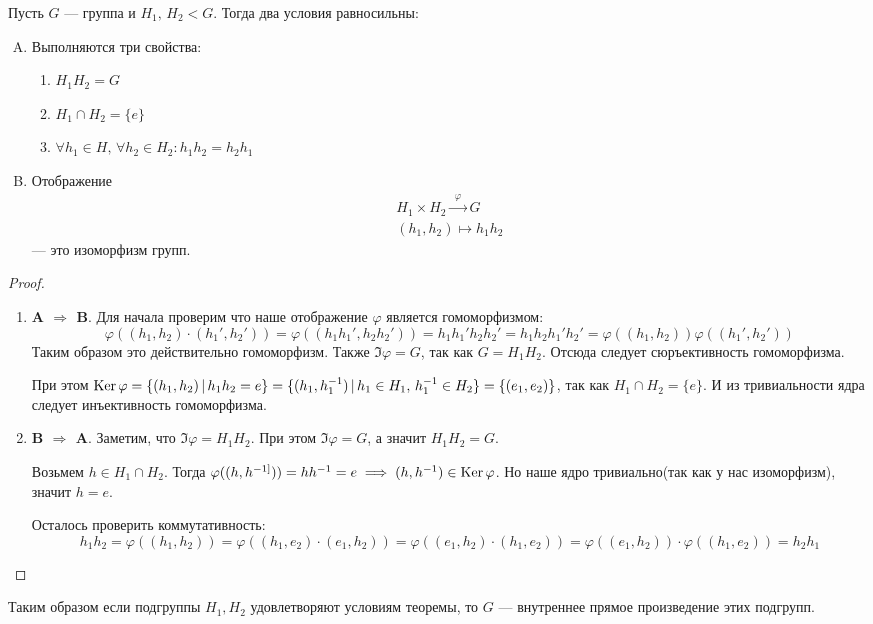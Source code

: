 \documentclass[../main.tex]{subfiles}
\begin{document}
\begin{theorem}
  Пусть $G$ --- группа и $H_1,\, H_2 < G$. Тогда два условия равносильны:
  \begin{enumerate}[A.]
    \item Выполняются три свойства:
    \begin{enumerate}[1)]
      \item $H_1H_2 = G$
      \item $H_1 \cap H_2 = \{e\}$
      \item $\forall h_1 \in H,\, \forall h_2 \in H_2\colon h_1h_2 = h_2h_1$
    \end{enumerate}
    \item Отображение
    \begin{equation*}
      \begin{gathered}
        H_1 \times H_2 \xrightarrow{\;\, \varphi \;\,} G \\
        (h_1, h_2) \mapsto h_1h_2
      \end{gathered}
    \end{equation*}
    --- это изоморфизм групп.
  \end{enumerate}
\end{theorem}
\begin{proof}
  \begin{enumerate}
    \item[] \textbf{A $\Rightarrow$ B}. Для начала проверим что наше отображение $\varphi$ является гомоморфизмом:
    \begin{equation*}
      \varphi((h_1, h_2) \cdot (h_1', h_2')) =
      \varphi((h_1h_1', h_2h_2')) =
      h_1h_1'h_2h_2' =
      h_1h_2h_1'h_2' =
      \varphi((h_1, h_2))\varphi((h_1', h_2'))
    \end{equation*}
    Таким образом это действительно гомоморфизм. Также $\Im \varphi = G$, так как $G = H_1H_2$. Отсюда следует сюръективность гомоморфизма.

    При этом $\operatorname{Ker} \varphi = \{(h_1, h_2) \, | \, h_1h_2 = e\} = \{(h_1, h_1^{-1}) \, | \, h_1 \in H_1, \, h_1^{-1} \in H_2\} = \{(e_1, e_2)\}$, так как $H_1 \cap H_2 = \{e\}$. И из тривиальности ядра следует инъективность гомоморфизма.
    \item[] \textbf{B $\Rightarrow$ A}.
    Заметим, что $\Im \varphi = H_1H_2$. При этом $\Im \varphi = G$, а значит $H_1H_2 = G$.

    Возьмем $h \in H_1 \cap H_2$. Тогда $\varphi((h, h^{-1]})) = hh^{-1} = e \implies (h, h^{-1}) \in \operatorname{Ker} \varphi$. Но наше ядро тривиально(так как у нас изоморфизм), значит $h = e$.

    Осталось проверить коммутативность:
    \begin{equation*}
    h_1h_2 = \varphi((h_1, h_2)) = \varphi((h_1, e_2) \cdot (e_1, h_2)) = \varphi((e_1, h_2) \cdot (h_1, e_2)) = \varphi((e_1, h_2)) \cdot \varphi((h_1, e_2)) = h_2h_1
    \end{equation*}
  \end{enumerate}
\end{proof}
  Таким образом если подгруппы $H_1, H_2$ удовлетворяют условиям теоремы, то $G$ --- внутреннее прямое произведение этих подгрупп.
\end{document}
